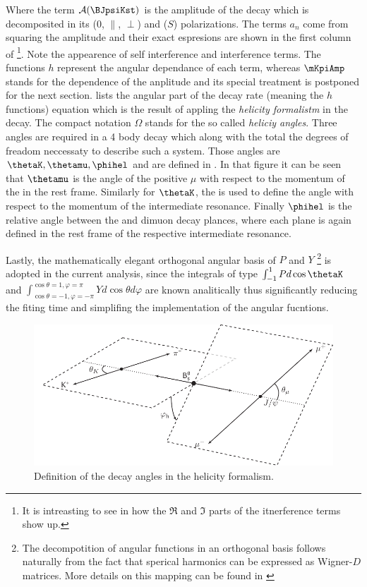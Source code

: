 \noindent Where the term $\mathcal{A}(\text{\BJpsiKst})$ is the amplitude of the decay which is decomposited in its \pwave ($0$, $\parallel$, $\perp$) and \swave ($S$) polarizations.
The terms $a_n$ come from squaring the amplitude and their exact espresions are shown in the first column of 
\footnote{It is intreasting to see in \cite{jeroenThesis} how the $\Re$ and $\Im$ parts of the itnerference terms show up.}. 
Note the appearence of \pwave self interference and \spwave interference terms. The functions $h$ represent the angular dependance of each term, whereas $\mKpiAmp$ stands 
for the \mkpi dependence of the anplitude and its special treatment is postponed for the next section.  lists the angular part of the decay rate 
(meaning the $h$ functions) equation which is the result of appling the \emph{helicity formalistm} in the \BJpsiKst decay. The compact
notation $\Omega$ stands for the so called \emph{heliciy angles}. Three angles are required in a 4 body decay which along with the \mkpi
total the degrees of freadom neccessaty to describe such a system. Those angles are $\thetaK,\thetamu,\phihel$ and are defined in . 
In that figure it can be seen that $\thetamu$ is the angle of the positive $\mu$ with respect to the momentum of the \Jpsi in the \Bs rest frame.
Similarly for $\thetaK$, the \kaon is used to define the angle with respect to the momentum of the intermediate \Kpi resonance. Finally $\phihel$ is 
the relative angle between the \Kpi and dimuon decay plances, where each plane is again defined in the rest frame of the respective intermediate resonance.  

Lastly, the mathematically elegant orthogonal angular basis of $P$ and $Y$
\footnote{The decompotition of angular functions in an orthogonal basis follows naturally from the fact that sperical harmonics can be expressed as 
Wigner-$D$ matrices. More details on this mapping can be found in \cite{jeroenThesis} } 
is adopted in the current analysis, since the integrals of type $\int_{-1}^{1}Pd\cos\thetaK$ and $\int_{\cos\theta=-1,\varphi=-\pi}^{\cos\theta=1,\varphi=\pi}Yd\cos\theta d\varphi$ are known 
analitically thus significantly reducing the fiting time and simplifing the implementation of the angular fucntions.


\begin{figure}[h]
\begin{center}
  \includegraphics[width=\textwidth]{Figures/Chapter4/helAngles.pdf}
  \caption{Definition of the decay angles in the helicity formalism.}
  \label{helAngles}  
\end{center}
\end{figure}


